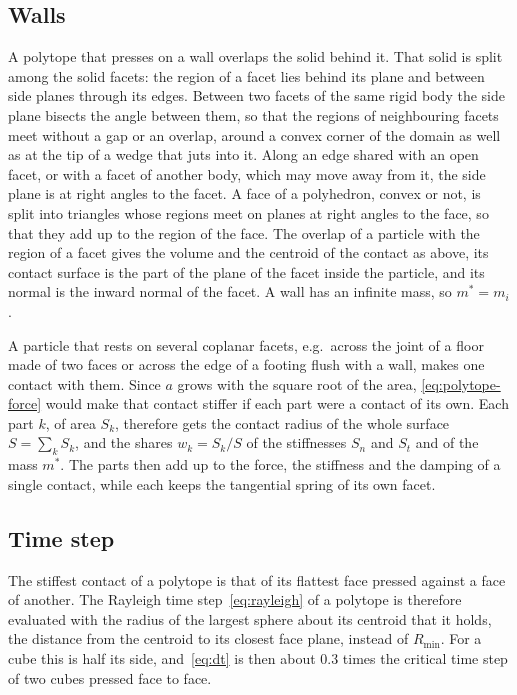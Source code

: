 \subsection{Walls}

A polytope that presses on a wall overlaps the solid behind it.
That solid is split among the solid facets: the region of a facet lies behind its plane and between side planes through its edges.
Between two facets of the same rigid body the side plane bisects the angle between them, so that the regions of neighbouring facets meet without a gap or an overlap, around a convex corner of the domain as well as at the tip of a wedge that juts into it.
Along an edge shared with an open facet, or with a facet of another body, which may move away from it, the side plane is at right angles to the facet.
A face of a polyhedron, convex or not, is split into triangles whose regions meet on planes at right angles to the face, so that they add up to the region of the face.
The overlap of a particle with the region of a facet gives the volume and the centroid of the contact as above, its contact surface is the part of the plane of the facet inside the particle, and its normal is the inward normal of the facet.
A wall has an infinite mass, so $m^{*}=m_{i}$.

A particle that rests on several coplanar facets, e.g.\ across the joint of a floor made of two faces or across the edge of a footing flush with a wall, makes one contact with them.
Since $a$ grows with the square root of the area, \eqref{eq:polytope-force} would make that contact stiffer if each part were a contact of its own.
Each part $k$, of area $S_{k}$, therefore gets the contact radius of the whole surface $S=\sum_{k}S_{k}$, and the shares $w_{k}=S_{k}/S$ of the stiffnesses $S_{n}$ and $S_{t}$ and of the mass $m^{*}$.
The parts then add up to the force, the stiffness and the damping of a single contact, while each keeps the tangential spring of its own facet.

\subsection{Time step}

The stiffest contact of a polytope is that of its flattest face pressed against a face of another.
The Rayleigh time step~\eqref{eq:rayleigh} of a polytope is therefore evaluated with the radius of the largest sphere about its centroid that it holds, the distance from the centroid to its closest face plane, instead of $R_{\min}$.
For a cube this is half its side, and~\eqref{eq:dt} is then about \num{0.3} times the critical time step of two cubes pressed face to face.

